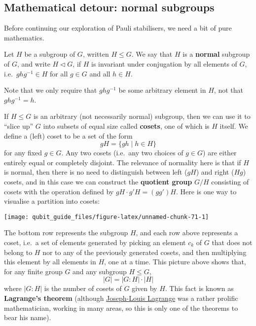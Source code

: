 \documentclass[fleqn]{article}
\begin{document}
\hypertarget{mathematical-detour-normal-subgroups}{%
\subsection{Mathematical detour: normal subgroups}\label{mathematical-detour-normal-subgroups}}

Before continuing our exploration of Pauli stabilisers, we need a bit of pure mathematics.

Let \(H\) be a subgroup of \(G\), written \(H\leqslant G\).
We say that \(H\) is a \textbf{normal} subgroup of \(G\), and write \(H\triangleleft G\), if \(H\) is invariant under conjugation by all elements of \(G\), i.e.~\(ghg^{-1}\in H\) for all \(g\in G\) and all \(h\in H\).

Note that we only require that \(ghg^{-1}\) be some arbitrary element in \(H\), not that \(ghg^{-1}=h\).

If \(H\leqslant G\) is an arbitrary (not necessarily normal) subgroup, then we can use it to ``slice up'' \(G\) into subsets of equal size called \textbf{cosets}, one of which is \(H\) itself.
We define a (left) coset to be a set of the form
\[
  gH = \{gh \mid h\in H\}
\]
for any fixed \(g\in G\).
Any two cosets (i.e.~any two choices of \(g\in G\)) are either entirely equal or completely disjoint.
The relevance of normality here is that if \(H\) is normal, then there is no need to distinguish between left (\(gH\)) and right (\(Hg\)) cosets, and in this case we can construct the \textbf{quotient group} \(G/H\) consisting of cosets with the operation defined by \(gH\cdot g'H=(gg')H\).
Here is one way to visualise a partition into cosets:

\begin{center}\texttt{[image: qubit\_guide\_files/figure-latex/unnamed-chunk-71-1]} \end{center}

The bottom row represents the subgroup \(H\), and each row above represents a coset, i.e.~a set of elements generated by picking an element \(c_k\) of \(G\) that does not belong to \(H\) nor to any of the previously generated cosets, and then multiplying this element by all elements in \(H\), one at a time.
This picture above shows that, for any finite group \(G\) and any subgroup \(H\leqslant G\),
\[
  |G| = |G:H|\cdot|H|
\]
where \(|G:H|\) is the number of cosets of \(G\) given by \(H\).
This fact is known as \textbf{Lagrange's theorem} (although \href{https://en.wikipedia.org/wiki/Joseph-Louis_Lagrange}{Joseph-Louis Lagrange} was a rather prolific mathematician, working in many areas, so this is only one of the theorems to bear his name).
\end{document}

